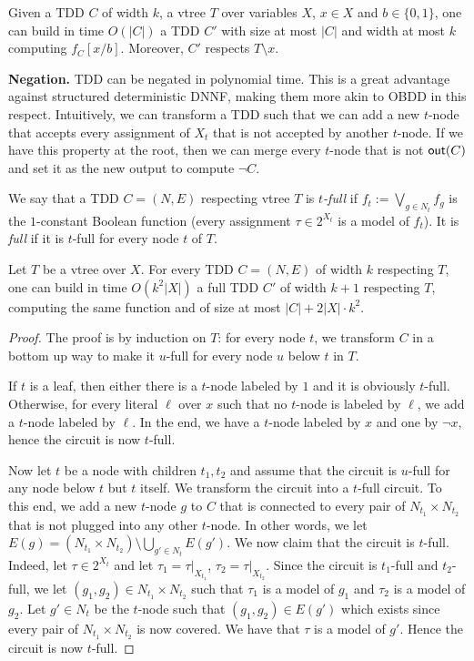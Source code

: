 \documentclass[a4paper,UKenglish,cleveref, autoref, thm-restate]{lipics-v2021}
\begin{document}
\begin{toappendix}
\begin{theorem}
  \label{thm:prop:conditioning} Given a TDD $C$ of width $k$, a vtree $T$ over variables $X$,  $x \in X$ and $b \in \{0,1\}$, one can build in time $O(|C|)$  a TDD $C'$ with size at most $|C|$ and width at most $k$ computing $f_C[x/b]$. Moreover,  $C'$ respects $T \setminus x$.
\end{theorem}



\textbf{Negation.} TDD can be negated in polynomial time. This is a great advantage against structured deterministic DNNF, making them more akin to OBDD in this respect. Intuitively, we can transform a TDD such that we can add a new $t$-node that accepts every assignment of $X_t$ that is not accepted by another $t$-node. If we have this property at the root, then we can merge every $t$-node that is not $\out$ and set it as the new output to compute $\neg C$.

We say that a TDD $C=(N,E)$ respecting vtree $T$ is \emph{$t$-full} if $f_t := \bigvee_{g \in N_t} f_g$ is the $1$-constant Boolean function (every assignment $\tau \in 2^{X_t}$ is a model of $f_t$). It is \emph{full} if it is $t$-full for every node $t$ of $T$.

\begin{proposition}
  \label{prop:prop:tdd-full} Let $T$ be a vtree over $X$. For every TDD $C=(N,E)$ of width $k$ respecting $T$, one can build in time $O(k^2|X|)$  a full TDD $C'$ of width $k+1$ respecting $T$, computing the same function and of size at most $|C| + 2|X|\cdot k^2$. 
\end{proposition}
\begin{proof}
  The proof is by induction on $T$: for every node $t$, we transform $C$ in a bottom up way to make it $u$-full for every node $u$ below $t$ in $T$.

  If $t$ is a leaf, then either there is a $t$-node labeled by $1$ and it is obviously $t$-full. Otherwise, for every literal $\ell$ over $x$ such that no $t$-node is labeled by $\ell$, we add a $t$-node labeled by $\ell$. In the end, we have a $t$-node labeled by $x$ and one by $\neg x$, hence the circuit is now $t$-full.

  Now let $t$ be a node with children $t_1,t_2$ and assume that the circuit is $u$-full for any node below $t$ but $t$ itself. We transform the circuit into a $t$-full circuit. To this end, we add a new $t$-node $g$ to $C$ that is connected to every pair of $N_{t_1}\times N_{t_2}$ that is not plugged into any other $t$-node. In other words, we let $E(g) = (N_{t_1} \times N_{t_2}) \setminus \bigcup_{g' \in N_t} E(g')$. We now claim that the circuit is $t$-full. Indeed, let $\tau \in 2^{X_t}$ and let $\tau_1 = \tau|_{X_{t_1}}$, $\tau_2 = \tau|_{X_{t_2}}$. Since the circuit is $t_1$-full and $t_2$-full, we let $(g_1,g_2) \in N_{t_1}\times N_{t_2}$ such that $\tau_1$ is a model of $g_1$ and $\tau_2$ is a model of $g_2$. Let $g' \in N_t$ be the $t$-node such that $(g_1,g_2) \in E(g')$ which exists since every pair of $N_{t_1}\times N_{t_2}$ is now covered. We have that $\tau$ is a model of $g'$. Hence the circuit is now $t$-full.


\end{proof}
\end{toappendix}
\end{document}

